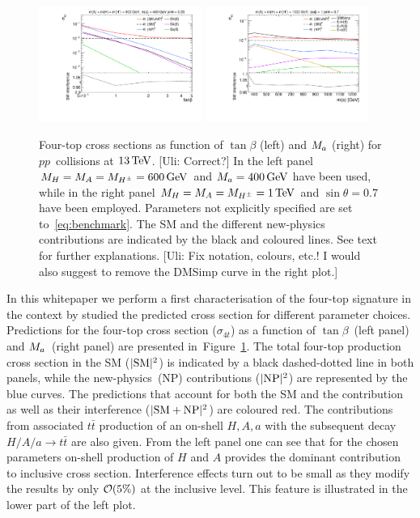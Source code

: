 \begin{figure}[!t]
\centering
\includegraphics[width=0.475\textwidth]{texinputs/04_grid/figures/DMHF/4tops/WHP_final_tbscan.pdf} \quad 
\includegraphics[width=0.475\textwidth]{texinputs/04_grid/figures/DMHF/4tops/WHP_final_mascan.pdf}
\vspace{4mm}
\caption{\label{fig:4top} Four-top cross sections as function of $\tan \beta$ (left) and $M_{a}$ (right) for $pp$~collisions at $13 \, {\rm TeV}$.  {\color{red} [Uli: Correct?]} In the left panel $M_{H} =M_{A}=M_{H^{\pm}} = 600 \, {\rm GeV}$ and  $M_{a} = 400 \, {\rm GeV}$ have been used, while in the right panel $M_{H} =M_{A}=M_{H^{\pm}} = 1 \, {\rm TeV}$ and  $\sin \theta = 0.7$ have been employed. Parameters not explicitly specified are set to~\eqref{eq:benchmark}.  The SM and the different new-physics contributions are indicated by the black and coloured lines. See text for further explanations. {\color{red} [Uli: Fix notation, colours,  etc.! I would also suggest to remove the DMSimp curve in the right plot.]}}
\end{figure}

In this whitepaper we perform a first characterisation of the four-top signature in the \hdma context by studied the predicted cross section for different parameter choices. Predictions for the four-top cross section ($\sigma_{4t}$) as a function of $\tan \beta$~(left panel) and $M_{a}$~(right panel) are presented in~Figure~\ref{fig:4top}. The total four-top production cross section in the SM ($|{\rm SM}|^2$) is indicated by a black dashed-dotted line in both panels, while the new-physics~(NP) contributions ($|{\rm NP}|^2$) are represented by the blue curves. The predictions that account for both the SM and the \hdma contribution as well as  their interference ($|{\rm SM} + {\rm NP}|^2$) are coloured red. The contributions from associated $t \bar t$ production of an on-shell $H, A, a$ with the subsequent decay $H/A/a \to t \bar t$ are also given. From the left panel one can see that for the chosen parameters on-shell production of $H$ and $A$ provides the dominant contribution to inclusive cross section. Interference effects turn out to be small as they modify the results  by only ${\cal O} (5\%)$ at the inclusive level. This feature is illustrated in the lower part of the left plot.

